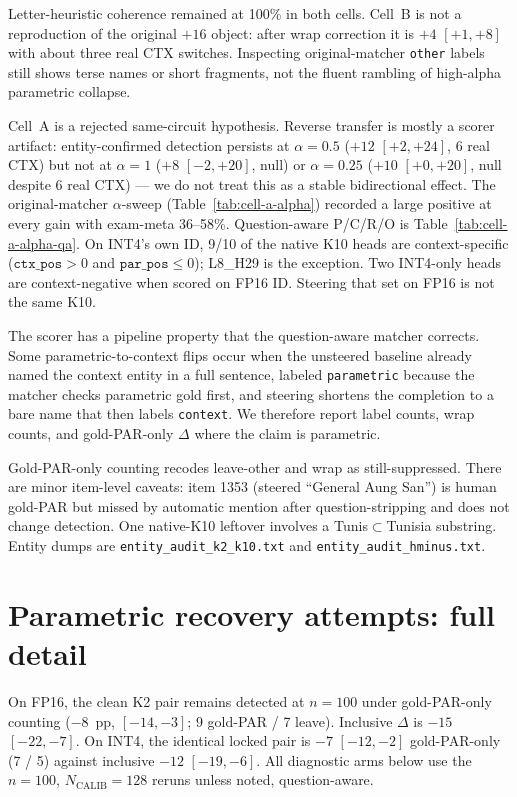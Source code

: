 \documentclass{article} %
\begin{document}
Letter-heuristic coherence remained at 100\% in both cells. Cell~B is not a reproduction of the original $+16$ object: after wrap correction it is $+4$ $[+1,+8]$ with about three real CTX switches. Inspecting original-matcher \texttt{other} labels still shows terse names or short fragments, not the fluent rambling of high-alpha parametric collapse.

Cell~A is a rejected same-circuit hypothesis. Reverse transfer is mostly a scorer artifact: entity-confirmed detection persists at $\alpha{=}0.5$ ($+12$ $[+2,+24]$, 6 real CTX) but not at $\alpha{=}1$ ($+8$ $[-2,+20]$, null) or $\alpha{=}0.25$ ($+10$ $[+0,+20]$, null despite 6 real CTX) --- we do not treat this as a stable bidirectional effect. The original-matcher $\alpha$-sweep (Table~\ref{tab:cell-a-alpha}) recorded a large positive at every gain with exam-meta 36--58\%. Question-aware P/C/R/O is Table~\ref{tab:cell-a-alpha-qa}. On INT4's own ID, 9/10 of the native K10 heads are context-specific ($\texttt{ctx\_pos}{>}0$ and $\texttt{par\_pos}{\le}0$); L8\_H29 is the exception. Two INT4-only heads are context-negative when scored on FP16 ID. Steering that set on FP16 is not the same K10.

The scorer has a pipeline property that the question-aware matcher corrects. Some parametric-to-context flips occur when the unsteered baseline already named the context entity in a full sentence, labeled \texttt{parametric} because the matcher checks parametric gold first, and steering shortens the completion to a bare name that then labels \texttt{context}. We therefore report label counts, wrap counts, and gold-PAR-only $\Delta$ where the claim is parametric.

Gold-PAR-only counting recodes leave-other and wrap as still-suppressed. There are minor item-level caveats: item 1353 (steered ``General Aung San'') is human gold-PAR but missed by automatic mention after question-stripping and does not change detection. One native-K10 leftover involves a Tunis$\subset$Tunisia substring. Entity dumps are \texttt{entity\_audit\_k2\_k10.txt} and \texttt{entity\_audit\_hminus.txt}.

\section{Parametric recovery attempts: full detail}
\label{app:parametric}

On FP16, the clean K2 pair remains detected at $n{=}100$ under gold-PAR-only counting ($-8$~pp, $[-14,-3]$; 9 gold-PAR / 7 leave). Inclusive $\Delta$ is $-15$ $[-22,-7]$. On INT4, the identical locked pair is $-7$ $[-12,-2]$ gold-PAR-only (7 / 5) against inclusive $-12$ $[-19,-6]$. All diagnostic arms below use the $n{=}100$, $N_{\mathrm{CALIB}}{=}128$ reruns unless noted, question-aware.
\end{document}
